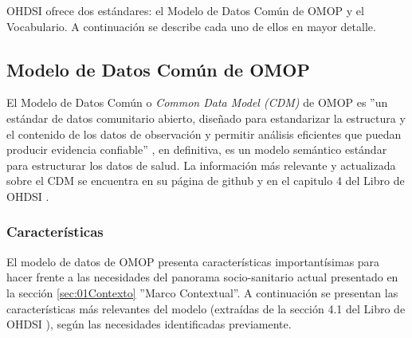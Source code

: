OHDSI ofrece dos estándares: el Modelo de Datos Común de OMOP y el Vocabulario. A continuación se describe cada uno de ellos en mayor detalle.


\subsection{Modelo de Datos Común de OMOP} \label{subsec:07cdm}

El Modelo de Datos Común o \textit{Common Data Model (CDM)} de OMOP es ''un estándar de datos comunitario abierto, diseñado para estandarizar la estructura y el contenido de los datos de observación y permitir análisis eficientes que puedan producir evidencia confiable'' \cite{gitPagesCMD}, en definitiva, es un modelo semántico estándar para estructurar los datos de salud. La información más relevante y actualizada sobre el CDM se encuentra en su página de github \cite{gitPagesCMD} y en el capitulo 4 del Libro de OHDSI \cite{OHDSIbook}.

\subsubsection{Características}

El modelo de datos de OMOP presenta características importantísimas para hacer frente a las necesidades del panorama socio-sanitario actual presentado en la sección \ref{sec:01Contexto} ''Marco Contextual''. A continuación se presentan las características más relevantes del modelo (extraídas de la sección  4.1 del Libro de OHDSI \cite{OHDSIbook}), según las necesidades identificadas previamente.

